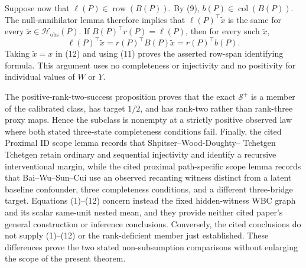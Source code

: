 Suppose now that \(\ell(P)\in\operatorname{row}(B(P))\).  By (9),
\(b(P)\in\operatorname{col}(B(P))\).  The null-annihilator lemma therefore implies
that \(\ell(P)^\top\widetilde x\) is the same for every
\(\widetilde x\in\mathcal H_{\mathrm{obs}}(P)\).  If
\(B(P)^\top r(P)=\ell(P)\), then for every such \(\widetilde x\),
\[
 \ell(P)^\top\widetilde x
 =r(P)^\top B(P)\widetilde x
 =r(P)^\top b(P).
 \tag{12}
\]
Taking \(\widetilde x=x\) in (12) and using (11) proves the asserted row-span
identifying formula.  This argument uses no completeness or injectivity and no
positivity for individual values of \(W\) or \(Y\).

The positive-rank-two-success proposition proves that the exact
\(\mathcal S^+\) is a member of the calibrated class, has target \(1/2\), and has
rank-two rather than rank-three proxy maps.  Hence the subclass is nonempty at a
strictly positive observed law where both stated three-state completeness conditions
fail.  Finally, the cited Proximal ID scope lemma records that Shpitser--Wood-Doughty--
Tchetgen Tchetgen retain ordinary and sequential injectivity and identify a recursive
interventional margin, while the cited proximal path-specific scope lemma records that
Bai--Wu--Sun--Cui use an observed recanting witness distinct from a latent baseline
confounder, three completeness conditions, and a different three-bridge target.
Equations (1)--(12) concern instead the fixed hidden-witness WBC graph and its scalar
same-unit nested mean, and they provide neither cited paper's general construction or
inference conclusions.  Conversely, the cited conclusions do not supply (1)--(12) or
the rank-deficient member just established.  These differences prove the two stated
non-subsumption comparisons without enlarging the scope of the present theorem.